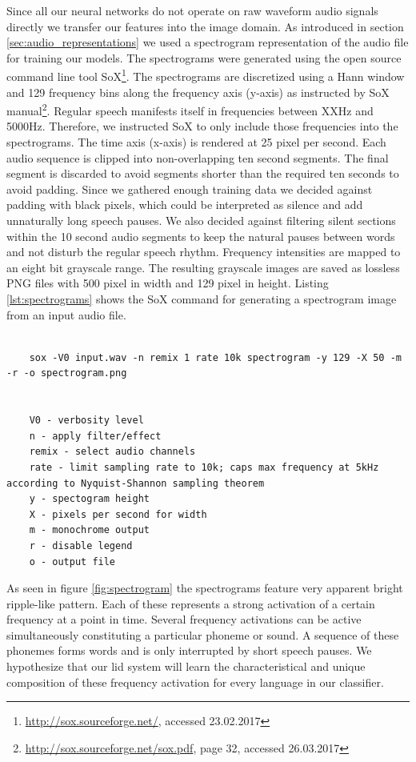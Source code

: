	Since all our neural networks do not operate on raw waveform audio signals directly we transfer our features into the image domain. As introduced in section \ref{sec:audio_representations} we used a spectrogram representation of the audio file for training our models. The spectrograms were generated using the open source command line tool SoX\footnote{\url{http://sox.sourceforge.net/}, accessed 23.02.2017}. The spectrograms are discretized using a Hann window  and 129 frequency bins along the frequency axis (y-axis) as instructed by SoX manual\footnote{\url{http://sox.sourceforge.net/sox.pdf}, page 32, accessed 26.03.2017}. Regular speech manifests itself in frequencies between XXHz  and 5000Hz. Therefore, we instructed SoX to only include those frequencies into the spectrograms. The time axis (x-axis) is rendered at 25 pixel per second. Each audio sequence is clipped into non-overlapping ten second segments. The final segment is discarded to avoid segments shorter than the required ten seconds to avoid padding. Since we gathered enough training data we decided against padding with black pixels, which could be interpreted as silence and add unnaturally long speech pauses. We also decided against filtering silent sections within the 10 second audio segments to keep the natural pauses between words and not disturb the regular speech rhythm. Frequency intensities are mapped to an eight bit grayscale range. The resulting grayscale images are saved as lossless PNG files with 500 pixel in width and 129 pixel in height. Listing \ref{lst:spectrograms} shows the SoX command for generating a spectrogram image from an input audio file.
	
	\begin{lstlisting}[caption={Generating monochrome spectrograms with SoX}, label={lst:spectrograms}]
    
    sox -V0 input.wav -n remix 1 rate 10k spectrogram -y 129 -X 50 -m -r -o spectrogram.png
    
    
    V0 - verbosity level 
    n - apply filter/effect
    remix - select audio channels
    rate - limit sampling rate to 10k; caps max frequency at 5kHz according to Nyquist-Shannon sampling theorem
    y - spectogram height
    X - pixels per second for width
    m - monochrome output
    r - disable legend
    o - output file
    \end{lstlisting}
	
	As seen in figure \ref{fig:spectrogram} the spectrograms feature very apparent bright ripple-like pattern. Each of these represents a strong activation of a certain frequency at a point in time. Several frequency activations can be active simultaneously constituting a particular phoneme or sound. A sequence of these phonemes forms words and is only interrupted by short speech pauses. We hypothesize that our \ac{lid} system will learn the characteristical and unique composition of these frequency activation for every language in our classifier. 

